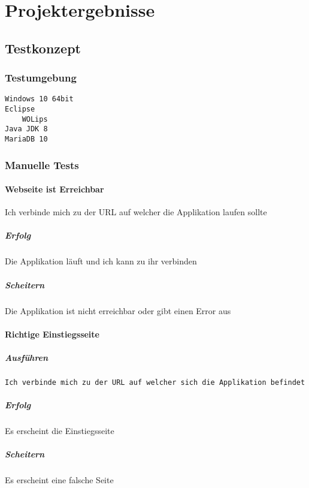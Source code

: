 \documentclass[a4paper, 11pt]{article}
\begin{document}
\section{Projektergebnisse}

\subsection{Testkonzept}

\subsubsection{Testumgebung}

\begin{verbatim}
Windows 10 64bit
Eclipse
    WOLips
Java JDK 8
MariaDB 10
\end{verbatim}

\subsubsection{Manuelle Tests}

\paragraph{Webseite ist Erreichbar}

Ich verbinde mich zu der URL auf welcher die Applikation laufen sollte

\subparagraph{Erfolg}

Die Applikation läuft und ich kann zu ihr verbinden

\subparagraph{Scheitern}

Die Applikation ist nicht erreichbar oder gibt einen Error aus

\paragraph{Richtige Einstiegsseite}

\subparagraph{Ausführen}

\begin{verbatim}
Ich verbinde mich zu der URL auf welcher sich die Applikation befindet
\end{verbatim}

\subparagraph{Erfolg}

Es erscheint die Einstiegsseite

\subparagraph{Scheitern}

Es erscheint eine falsche Seite
\end{document}
